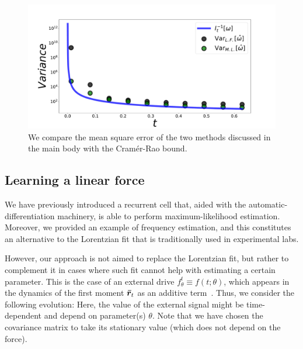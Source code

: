 \begin{figure}[t!]
    \centering
    \includegraphics[width=1.\textwidth]{Figures/CMON/estimation/variance_comparison_hori.pdf}
    \caption{We compare the mean square error of the two methods discussed in the main body with the Cramér-Rao bound.}
    \label{fig:comparison_estimation}
\end{figure}

\subsection{Learning a linear force}
We have previously introduced a recurrent cell that, aided with the automatic-differentiation machinery, is able to perform maximum-likelihood estimation. Moreover, we provided an example of frequency estimation, and this constitutes an alternative to the Lorentzian fit that is traditionally used in experimental labs.

However, our approach is not aimed to replace the Lorentzian fit, but rather to complement it in cases where such fit cannot help with estimating a certain parameter. This is the case of an external drive $f^t_\theta \equiv f(t;\theta)$, which appears in the dynamics of the first moment $\bm{\bar{r}}_t$ as an additive term~\cite{wisemanbook}. Thus, we consider the following evolution:
Here, the value of the external signal might be time-dependent and depend on parameter(s) $\theta$.
Note that we have chosen the covariance matrix to take its stationary value (which does not depend on the force).

